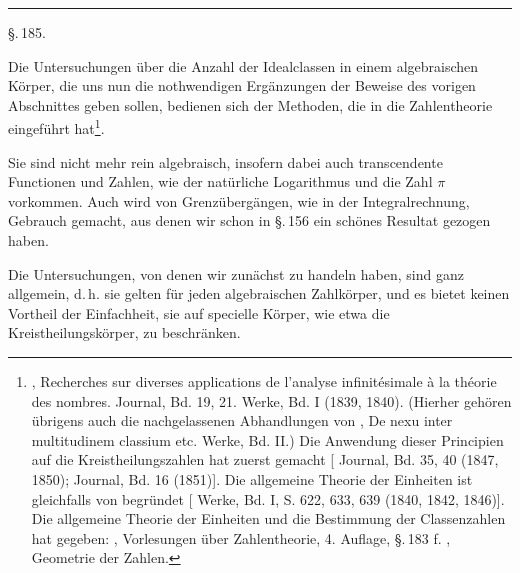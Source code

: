 
\begin{center}


\rule{4em}{0.4pt}

\S.\,185.

\end{center}

Die Untersuchungen über die Anzahl der Idealclassen in einem algebraischen Körper, die uns nun die nothwendigen Ergänzungen der Beweise des vorigen Abschnittes geben sollen, bedienen sich der Methoden, die  in die Zahlentheorie eingeführt hat\begingroup\renewcommand{\thefootnote}{\arabic{footnote})}\footnote{, Recherches sur diverses applications de l'analyse infinitésimale à la théorie des nombres.  Journal, Bd. 19, 21.  Werke, Bd. I (1839, 1840). (Hierher gehören übrigens auch die nachgelassenen Abhandlungen von , \glqq De nexu inter multitudinem classium etc.\grqq{}  Werke, Bd. II.) Die Anwendung dieser Principien auf die Kreistheilungszahlen hat zuerst  gemacht [ Journal, Bd. 35, 40 (1847, 1850);  Journal, Bd. 16 (1851)]. Die allgemeine Theorie der Einheiten ist gleichfalls von  begründet [ Werke, Bd. I, S. 622, 633, 639 (1840, 1842, 1846)]. Die allgemeine Theorie der Einheiten und die Bestimmung der Classenzahlen hat  gegeben: , Vorlesungen über Zahlentheorie, 4. Auflage, \S.\,183 f. , Geometrie der Zahlen.}\endgroup.

Sie sind nicht mehr rein algebraisch, insofern dabei auch transcendente Functionen und Zahlen, wie der natürliche Logarithmus und die Zahl $\pi$ vorkommen. Auch wird von Grenzübergängen, wie in der Integralrechnung, Gebrauch gemacht, aus denen wir schon in \S.\,156 ein schönes Resultat gezogen haben.

Die Untersuchungen, von denen wir zunächst zu handeln haben, sind ganz allgemein, d.\,h. sie gelten für jeden algebraischen Zahlkörper, und es bietet keinen Vortheil der Einfachheit, sie auf specielle Körper, wie etwa die Kreistheilungskörper, zu beschränken.
